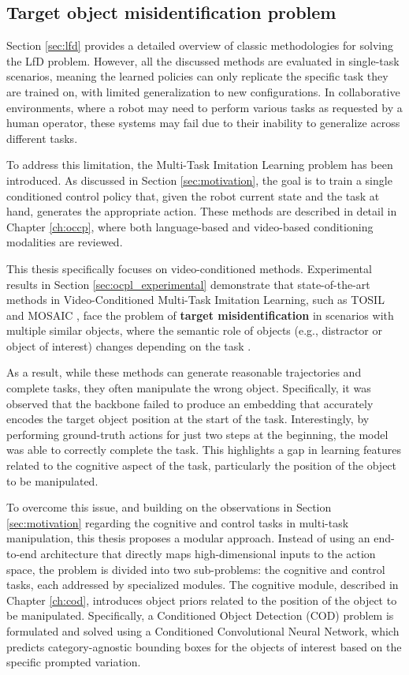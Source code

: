 \subsection{Target object misidentification problem}
\label{sec:sota_conclusion}
Section \ref{sec:lfd} provides a detailed overview of classic methodologies for solving the LfD problem. However, all the discussed methods are evaluated in single-task scenarios, meaning the learned policies can only replicate the specific task they are trained on, with limited generalization to new configurations. In collaborative environments, where a robot may need to perform various tasks as requested by a human operator, these systems may fail due to their inability to generalize across different tasks.

To address this limitation, the Multi-Task Imitation Learning problem has been introduced. As discussed in Section \ref{sec:motivation}, the goal is to train a single conditioned control policy that, given the robot current state and the task at hand, generates the appropriate action. These methods are described in detail in Chapter \ref{ch:occp}, where both language-based and video-based conditioning modalities are reviewed.

This thesis specifically focuses on video-conditioned methods. Experimental results in Section \ref{sec:ocpl_experimental} demonstrate that state-of-the-art methods in Video-Conditioned Multi-Task Imitation Learning, such as TOSIL \cite{dasari2021transformers_one_shot} and MOSAIC \cite{mandi2022towards_more_generalizable_one_shot}, face the problem of \textbf{target misidentification} in scenarios with multiple similar objects, where the semantic role of objects (e.g., distractor or object of interest) changes depending on the task \cite{foggia2024enhancing}.

As a result, while these methods can generate reasonable trajectories and complete tasks, they often manipulate the wrong object. Specifically, it was observed that the backbone failed to produce an embedding that accurately encodes the target object position at the start of the task. Interestingly, by performing ground-truth actions for just two steps at the beginning, the model was able to correctly complete the task. This highlights a gap in learning features related to the cognitive aspect of the task, particularly the position of the object to be manipulated.

To overcome this issue, and building on the observations in Section \ref{sec:motivation} regarding the cognitive and control tasks in multi-task manipulation, this thesis proposes a modular approach. Instead of using an end-to-end architecture that directly maps high-dimensional inputs to the action space, the problem is divided into two sub-problems: the cognitive and control tasks, each addressed by specialized modules. The cognitive module, described in Chapter \ref{ch:cod}, introduces object priors related to the position of the object to be manipulated. Specifically, a Conditioned Object Detection (COD) problem is formulated and solved using a Conditioned Convolutional Neural Network, which predicts category-agnostic bounding boxes for the objects of interest based on the specific prompted variation.

